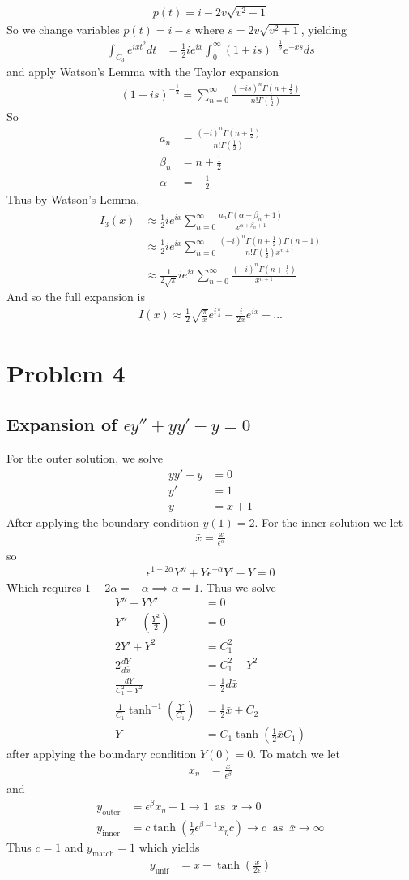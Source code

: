 \documentclass[12pt]{article}
\newcommand{\eq}[1]{\begin{align*}#1\end{align*}}
\newcommand{\on}[1]{\operatorname{#1}}
\begin{document}
\eq{
	p(t) = i - 2v\sqrt{v^2 + 1}
}
So we change variables $p(t) = i - s$ where $s = 2v\sqrt{v^2 + 1}$, yielding
\eq{
	\int_{C_3} e^{ixt^2} dt &= \frac{1}{2}ie^{ix} \int_0^\infty (1 + is)^{-\frac{1}{2}} e^{-xs} ds
}
and apply Watson's Lemma with the Taylor expansion
\eq{
	(1 + is)^{-\frac{1}{2}} = \sum_{n=0}^\infty \frac{(-is)^n\Gamma(n + \frac{1}{2})}{n!\Gamma(\frac{1}{2})}
}
So
\eq{
	a_n &= \frac{(-i)^n\Gamma(n + \frac{1}{2})}{n!\Gamma(\frac{1}{2})}\\
	\beta_n &= n + \frac{1}{2}\\
	\alpha &= -\frac{1}{2}
}
Thus by Watson's Lemma,
\eq{
	I_3(x) &\approx \frac{1}{2}ie^{ix}\sum_{n=0}^\infty \frac{a_n\Gamma(\alpha + \beta_n + 1)}{x^{\alpha + \beta_n + 1}}\\
	&\approx \frac{1}{2}ie^{ix}\sum_{n=0}^\infty \frac{(-i)^n \Gamma(n + \frac{1}{2}) \Gamma(n + 1)}{n!\Gamma(\frac{1}{2}) x^{n+1}}\\
	&\approx \frac{1}{2\sqrt{\pi}}ie^{ix}\sum_{n=0}^\infty \frac{(-i)^n \Gamma(n + \frac{1}{2})}{x^{n+1}}
}
And so the full expansion is
\eq{
	I(x) \approx \frac{1}{2}\sqrt{\frac{\pi}{x}}e^{i\frac{\pi}{4}} - \frac{i}{2x}e^{ix} + ...
}
\section*{Problem 4}
\subsection*{Expansion of $\epsilon y'' + yy' - y = 0$} For the outer solution, we solve
\eq{
	yy' - y &= 0\\
	y' &= 1\\
	y &= x + 1
}
After applying the boundary condition $y(1) = 2$.
For the inner solution we let
\eq{
	\bar{x} = \frac{x}{\epsilon^\alpha}
}
so
\eq{
	\epsilon^{1-2\alpha}Y'' + Y\epsilon^{-\alpha} Y' - Y = 0
}
Which requires $1-2\alpha = -\alpha \implies \alpha = 1$. Thus we solve
\eq{
	Y'' + YY' &= 0\\
	Y'' + (\frac{Y^2}{2}) &= 0\\
	2Y' + Y^2 &= C_1^2\\
	2\frac{dY}{d\bar{x}} &= C_1^2 - Y^2\\
	\frac{dY}{C_1^2 - Y^2} &= \frac{1}{2}d\bar{x}\\
	\frac{1}{C_1}\tanh^{-1}(\frac{Y}{C_1}) &= \frac{1}{2}\bar{x} + C_2\\
	Y &= C_1\tanh(\frac{1}{2}\bar{x} C_1)
}
after applying the boundary condition $Y(0) = 0$. To match we let
\eq{
	x_\eta &= \frac{x}{\epsilon^\beta}
}
and
\eq{
	y_{\on{outer}} &= \epsilon^\beta x_\eta + 1 \rightarrow 1\;\on{as}\;x\rightarrow 0\\
	y_{\on{inner}} &= c\tanh(\frac{1}{2}\epsilon^{\beta - 1}x_\eta c) \rightarrow c\;\on{as}\;\bar{x}\rightarrow \infty
}
Thus $c = 1$ and $y_{\on{match}} = 1$ which yields
\eq{
	y_{\on{unif}} &= x + \tanh(\frac{x}{2\epsilon})
}
\end{document}
